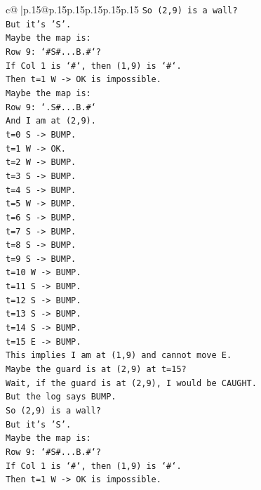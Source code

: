 \documentclass{article}
\begin{document}
{\begin{supertabular}{c@{$\;$}|p{.15\linewidth}@{}p{.15\linewidth}p{.15\linewidth}p{.15\linewidth}p{.15\linewidth}p{.15\linewidth}}
{{{\texttt{So (2,9) is a wall?} \\
\texttt{But it's 'S'.} \\
\texttt{Maybe the map is:} \\
\texttt{Row 9: `\#S\#...B.\#`?} \\
\texttt{If Col 1 is `\#`, then (1,9) is `\#`.} \\
\texttt{Then t=1 W {-}> OK is impossible.} \\
\texttt{Maybe the map is:} \\
\texttt{Row 9: `.S\#...B.\#`} \\
\texttt{And I am at (2,9).} \\
\texttt{t=0 S {-}> BUMP.} \\
\texttt{t=1 W {-}> OK.} \\
\texttt{t=2 W {-}> BUMP.} \\
\texttt{t=3 S {-}> BUMP.} \\
\texttt{t=4 S {-}> BUMP.} \\
\texttt{t=5 W {-}> BUMP.} \\
\texttt{t=6 S {-}> BUMP.} \\
\texttt{t=7 S {-}> BUMP.} \\
\texttt{t=8 S {-}> BUMP.} \\
\texttt{t=9 S {-}> BUMP.} \\
\texttt{t=10 W {-}> BUMP.} \\
\texttt{t=11 S {-}> BUMP.} \\
\texttt{t=12 S {-}> BUMP.} \\
\texttt{t=13 S {-}> BUMP.} \\
\texttt{t=14 S {-}> BUMP.} \\
\texttt{t=15 E {-}> BUMP.} \\
\texttt{This implies I am at (1,9) and cannot move E.} \\
\texttt{Maybe the guard is at (2,9) at t=15?} \\
\texttt{Wait, if the guard is at (2,9), I would be CAUGHT.} \\
\texttt{But the log says BUMP.} \\
\texttt{So (2,9) is a wall?} \\
\texttt{But it's 'S'.} \\
\texttt{Maybe the map is:} \\
\texttt{Row 9: `\#S\#...B.\#`?} \\
\texttt{If Col 1 is `\#`, then (1,9) is `\#`.} \\
\texttt{Then t=1 W {-}> OK is impossible.} \\
}}}
\end{supertabular}}
\end{document}
